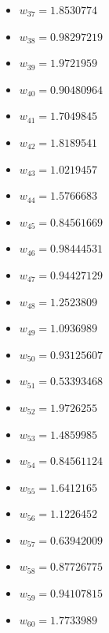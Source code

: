 \documentclass[11pt]{article}
\begin{document}
\begin{itemize}
\item $w_{37} = 1.8530774$
\item $w_{38} = 0.98297219$
\item $w_{39} = 1.9721959$
\item $w_{40} = 0.90480964$
\item $w_{41} = 1.7049845$
\item $w_{42} = 1.8189541$
\item $w_{43} = 1.0219457$
\item $w_{44} = 1.5766683$
\item $w_{45} = 0.84561669$
\item $w_{46} = 0.98444531$
\item $w_{47} = 0.94427129$
\item $w_{48} = 1.2523809$
\item $w_{49} = 1.0936989$
\item $w_{50} = 0.93125607$
\item $w_{51} = 0.53393468$
\item $w_{52} = 1.9726255$
\item $w_{53} = 1.4859985$
\item $w_{54} = 0.84561124$
\item $w_{55} = 1.6412165$
\item $w_{56} = 1.1226452$
\item $w_{57} = 0.63942009$
\item $w_{58} = 0.87726775$
\item $w_{59} = 0.94107815$
\item $w_{60} = 1.7733989$
\end{itemize}
\end{document}
